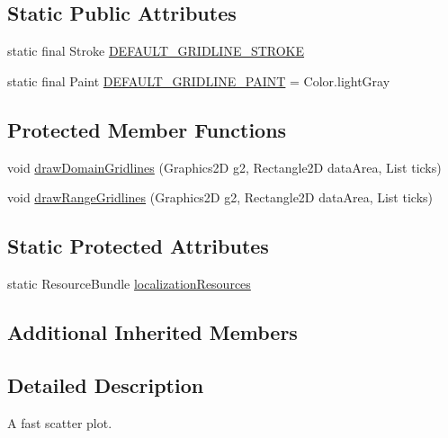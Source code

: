 \subsection*{Static Public Attributes}
\begin{DoxyCompactItemize}
\item 
static final Stroke \mbox{\hyperlink{classorg_1_1jfree_1_1chart_1_1plot_1_1_fast_scatter_plot_a84d4dae6345f3d311170f14175649057}{D\+E\+F\+A\+U\+L\+T\+\_\+\+G\+R\+I\+D\+L\+I\+N\+E\+\_\+\+S\+T\+R\+O\+KE}}
\item 
static final Paint \mbox{\hyperlink{classorg_1_1jfree_1_1chart_1_1plot_1_1_fast_scatter_plot_a3ed742389ea507561071c06243a09e67}{D\+E\+F\+A\+U\+L\+T\+\_\+\+G\+R\+I\+D\+L\+I\+N\+E\+\_\+\+P\+A\+I\+NT}} = Color.\+light\+Gray
\end{DoxyCompactItemize}
\subsection*{Protected Member Functions}
\begin{DoxyCompactItemize}
\item 
void \mbox{\hyperlink{classorg_1_1jfree_1_1chart_1_1plot_1_1_fast_scatter_plot_a2616d3e87b9f7c6778a1fe40dace38e5}{draw\+Domain\+Gridlines}} (Graphics2D g2, Rectangle2D data\+Area, List ticks)
\item 
void \mbox{\hyperlink{classorg_1_1jfree_1_1chart_1_1plot_1_1_fast_scatter_plot_a0360646729ef43492bd22e0873a91210}{draw\+Range\+Gridlines}} (Graphics2D g2, Rectangle2D data\+Area, List ticks)
\end{DoxyCompactItemize}
\subsection*{Static Protected Attributes}
\begin{DoxyCompactItemize}
\item 
static Resource\+Bundle \mbox{\hyperlink{classorg_1_1jfree_1_1chart_1_1plot_1_1_fast_scatter_plot_a29311f97de98f3e475311380ec0ad4aa}{localization\+Resources}}
\end{DoxyCompactItemize}
\subsection*{Additional Inherited Members}


\subsection{Detailed Description}
A fast scatter plot. 

